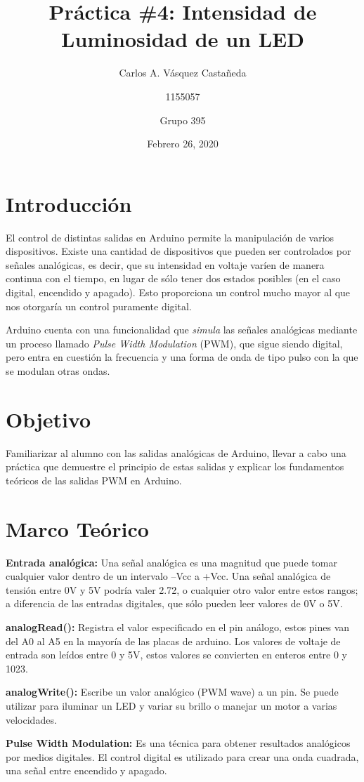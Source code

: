 \documentclass[12pt, letterpaper]{article}
\title{Práctica \#4: Intensidad de Luminosidad de un LED}
\author{Carlos A. Vásquez Castañeda \and 1155057 \and Grupo 395}
\date{Febrero 26, 2020}
\begin{document}
\maketitle
\section*{Introducción}
El control de distintas salidas en Arduino permite la manipulación de varios dispositivos. Existe una cantidad de dispositivos que pueden ser controlados por señales analógicas, es decir, que su intensidad en voltaje varíen de manera continua con el tiempo, en lugar de sólo tener dos estados posibles (en el caso digital, encendido y apagado). Esto proporciona un control mucho mayor al que nos otorgaría un control puramente digital.

Arduino cuenta con una funcionalidad que \textit{simula} las señales analógicas mediante un proceso llamado \textit{Pulse Width Modulation} (PWM), que sigue siendo digital, pero entra en cuestión la frecuencia y una forma de onda de tipo pulso con la que se modulan otras ondas.

\section*{Objetivo}
Familiarizar al alumno con las salidas analógicas de Arduino, llevar a cabo una práctica que demuestre el principio de estas salidas y explicar los fundamentos teóricos de las salidas PWM en Arduino.
\section*{Marco Teórico}
\textbf{Entrada analógica:} Una señal analógica es una magnitud que puede tomar cualquier valor dentro de un intervalo –Vcc a +Vcc. Una señal analógica de tensión entre 0V y 5V podría valer 2.72, o cualquier otro valor entre estos rangos; a diferencia de las entradas digitales, que sólo pueden leer valores de 0V o 5V.

\textbf{analogRead():} Registra el valor especificado en el pin análogo, estos pines van del A0 al A5 en la mayoría de las placas de arduino. Los valores de voltaje de entrada son leídos entre 0 y 5V, estos valores se convierten en enteros entre 0 y 1023.

\textbf{analogWrite():} Escribe un valor analógico (PWM wave) a un pin. Se puede utilizar para iluminar un LED y variar su brillo o manejar un motor a varias velocidades.

\textbf{Pulse Width Modulation:} Es una técnica para obtener resultados analógicos por medios digitales. El control digital es utilizado para crear una onda cuadrada, una señal entre encendido y apagado.
\end{document}
